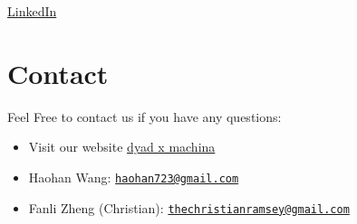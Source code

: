 \documentclass[]{book}
\theoremstyle{definition}
\theoremstyle{definition}
\theoremstyle{definition}
\theoremstyle{remark}
\begin{document}
\href{https://www.linkedin.com/in/christianramsey/}{LinkedIn}

\section{Contact}\label{contact}

Feel Free to contact us if you have any questions:

\begin{itemize}
\item
  Visit our website \href{dyadxmachina.com}{dyad x machina}
\item
  Haohan Wang:
  \href{mailto:haohan723@gmail.com}{\nolinkurl{haohan723@gmail.com}}
\item
  Fanli Zheng (Christian):
  \href{mailto:thechristianramsey@gmail.com}{\nolinkurl{thechristianramsey@gmail.com}}
\end{itemize}


\end{document}
